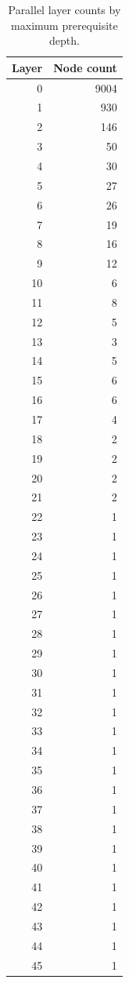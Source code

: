 \documentclass[11pt]{article}
\theoremstyle{remark}
\begin{document}
\begin{table}[H]
\centering
\small
\caption{Parallel layer counts by maximum prerequisite depth.}
\label{tab:depthhist}
\begin{tabular}{rr}
\toprule
Layer & Node count \\
\midrule
0 & 9004 \\
1 & 930 \\
2 & 146 \\
3 & 50 \\
4 & 30 \\
5 & 27 \\
6 & 26 \\
7 & 19 \\
8 & 16 \\
9 & 12 \\
10 & 6 \\
11 & 8 \\
12 & 5 \\
13 & 3 \\
14 & 5 \\
15 & 6 \\
16 & 6 \\
17 & 4 \\
18 & 2 \\
19 & 2 \\
20 & 2 \\
21 & 2 \\
22 & 1 \\
23 & 1 \\
24 & 1 \\
25 & 1 \\
26 & 1 \\
27 & 1 \\
28 & 1 \\
29 & 1 \\
30 & 1 \\
31 & 1 \\
32 & 1 \\
33 & 1 \\
34 & 1 \\
35 & 1 \\
36 & 1 \\
37 & 1 \\
38 & 1 \\
39 & 1 \\
40 & 1 \\
41 & 1 \\
42 & 1 \\
43 & 1 \\
44 & 1 \\
45 & 1 \\

\end{tabular}
\end{table}
\end{document}
